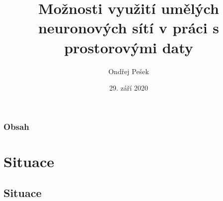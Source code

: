 \documentclass[10pt, t]{beamer}
\title[]{Možnosti využití umělých neuronových sítí v práci s prostorovými daty} %
\author{Ondřej Pešek} %
\institute[CTU] %
{
České vysoké učení technické v Praze \\ %
Fakulta stavební \\
Obor Geomatika
}
\date{29. září 2020} %
\begin{document}
\begin{frame}
\titlepage %
\end{frame}

\begin{frame}
\frametitle{Obsah} %
\tableofcontents %
\end{frame}


\section{Situace} %


\subsection{Situace}

\end{document}
